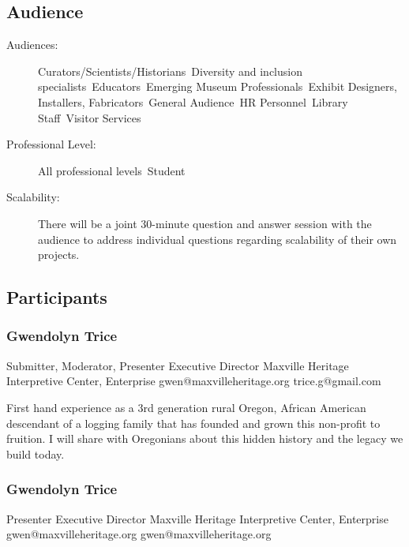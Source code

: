 \documentclass{report}
\begin{document}
              \subsection*{Audience}
                \begin{description}
                  \item [Audiences:]Curators/Scientists/Historians~Diversity and inclusion specialists~Educators~Emerging Museum Professionals~Exhibit Designers, Installers, Fabricators~General Audience~HR Personnel~Library Staff~Visitor Services~
                  \item[Professional Level:]All professional levels~Student~
                \item[Scalability:] There will be a joint 30-minute question and answer session with the audience to address individual questions regarding scalability of their own projects.

							
              \end{description}
            \subsection*{Participants}
              \subsubsection*{ Gwendolyn Trice }
              Submitter, Moderator, Presenter\newline
              Executive Director\newline
              Maxville Heritage Interpretive Center, Enterprise
              \newline
              gwen@maxvilleheritage.org\newline
              trice.g@gmail.com\newline

              First hand experience as a 3rd generation rural Oregon, African American descendant of a logging family that has founded and grown this non-profit to fruition. I will share with Oregonians about this hidden history and the legacy we build today.\newline


              

              
                \subsubsection*{ Gwendolyn Trice }
                Presenter\newline
                Executive Director\newline
                Maxville Heritage Interpretive Center, Enterprise
                \newline
                gwen@maxvilleheritage.org\newline
                gwen@maxvilleheritage.org\newline
\end{document}
